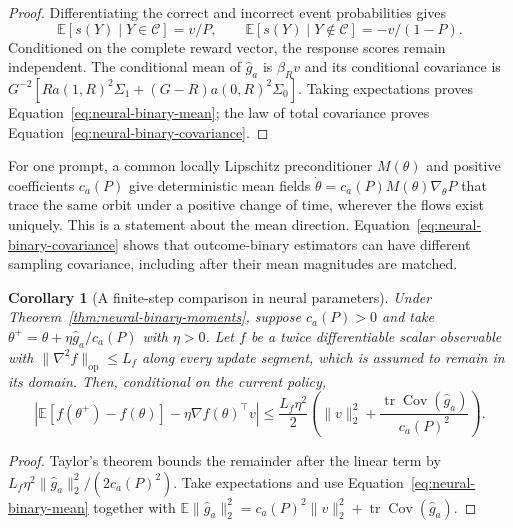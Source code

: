 \documentclass{article}
\newcommand{\enforcehalffinalproseline}{%
  \setlength{\parfillskip}{0pt plus .20\linewidth}}
\newcommand{\1}{\mathbf 1}
\newcommand{\E}{\mathbb E}
\newtheorem{corollary}[lemma]{Corollary}
\theoremstyle{remark}
\theoremstyle{definition}
\theoremstyle{plain}
\begin{document}
\begin{proof}
\enforcehalffinalproseline
Differentiating the correct and incorrect event probabilities gives
\[
 \E[s(Y)\mid Y\in\mathcal C]=v/P,
 \qquad
 \E[s(Y)\mid Y\notin\mathcal C]=-v/(1-P).
\]
Conditioned on the complete reward vector, the response scores remain
independent. The conditional mean of $\widehat g_a$ is $\beta_Rv$ and
its conditional covariance is
$G^{-2}[R a(1,R)^2\Sigma_1+(G-R)a(0,R)^2\Sigma_0]$.
Taking expectations proves Equation~\eqref{eq:neural-binary-mean}; the law
of total covariance proves Equation~\eqref{eq:neural-binary-covariance}.
\end{proof}

For one prompt, a common locally Lipschitz preconditioner $M(\theta)$ and
positive coefficients $c_a(P)$ give deterministic mean fields
$\dot\theta=c_a(P)M(\theta)\nabla_\theta P$ that trace the same orbit
under a positive change of time, wherever the flows exist uniquely.
This is a statement about the mean direction. Equation~\eqref{eq:neural-binary-covariance}
shows that outcome-binary estimators can have different sampling covariance,
including after their mean magnitudes are matched.

\begin{corollary}[A finite-step comparison in neural parameters]
\enforcehalffinalproseline
\label{cor:neural-binary-finite-step}
Under Theorem~\ref{thm:neural-binary-moments}, suppose $c_a(P)>0$ and take
$\theta^+=\theta+\eta\widehat g_a/c_a(P)$ with $\eta>0$. Let $f$ be a
twice differentiable scalar observable with
$\|\nabla^2f\|_{\mathrm{op}}\le L_f$ along every update segment, which
is assumed to remain in its domain. Then, conditional on the current policy,
\begin{equation}
 \left|\E[f(\theta^+)-f(\theta)]
       -\eta\nabla f(\theta)^\top v\right|
 \le\frac{L_f\eta^2}{2}
 \left(\|v\|_2^2+
       \frac{\operatorname{tr}\operatorname{Cov}(\widehat g_a)}{c_a(P)^2}
 \right).
 \label{eq:neural-binary-finite-step}
\end{equation}
\end{corollary}

\begin{proof}
\enforcehalffinalproseline
Taylor's theorem bounds the remainder after the linear term by
$L_f\eta^2\|\widehat g_a\|_2^2/(2c_a(P)^2)$. Take expectations and use
Equation~\eqref{eq:neural-binary-mean} together with
$\E\|\widehat g_a\|_2^2
=c_a(P)^2\|v\|_2^2+\operatorname{tr}\operatorname{Cov}(\widehat g_a)$.
\end{proof}
\end{document}
